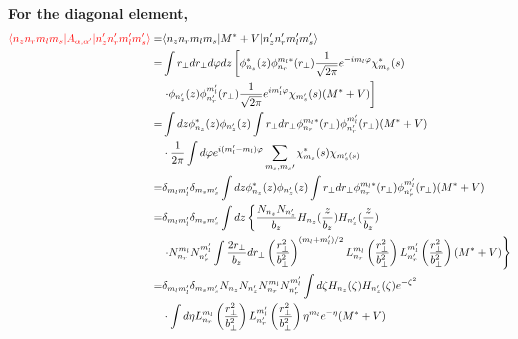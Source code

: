 \textbf{For the diagonal element,}
\begin{equation}
\begin{aligned}
  \textcolor{red}{\langle n_z n_r m_l m_s | A_{\alpha, \alpha^{\prime}} | n_z^{\prime} n_r^{\prime} m_l^{\prime} m_s^{\prime} \rangle} =& \langle n_z n_r m_l m_s | M^* + V | n_z^{\prime} n_r^{\prime} m_l^{\prime} m_s^{\prime} \rangle \\
  =& \int r_{\perp}dr_{\perp}d\varphi dz \left[ \phi_{n_z}^{\ast}(z) \phi_{n_r}^{m_l\ast}(r_{\perp}) \frac{1}{\sqrt{2\pi}}e^{-im_l\varphi} \chi_{m_s}^{\ast}(s) \right.\\
  & \left. \cdot \phi_{n_z^{\prime}}(z) \phi_{n_r^{\prime}}^{m_l^{\prime}}(r_{\perp}) \frac{1}{\sqrt{2\pi}}e^{im_l^{\prime}\varphi} \chi_{m_s^{\prime}}(s) (M^{\ast} + V) \right]  \\
  =& \int dz \phi_{n_z}^{\ast}(z)\phi_{n_z^{\prime}}(z) \int r_{\perp}dr_{\perp}\phi_{n_r}^{m_l\ast}(r_{\perp})\phi_{n_r^{\prime}}^{m_l^{\prime}}(r_{\perp})(M^{\ast}+V)  \\
  & \cdot \frac{1}{2\pi} \int d\varphi e^{i(m_l^{\prime} - m_l)\varphi} \sum_{m_s, m_{s}{\prime}} \chi_{m_s}^{\ast}(s)\chi_{m_s^{\prime}(s)}  \\
  =& \delta_{m_l m_l^{\prime}} \delta_{m_s m_s^{\prime}}\int dz \phi_{n_z}^{\ast}(z)\phi_{n_z^{\prime}}(z) \int r_{\perp}dr_{\perp}\phi_{n_r}^{m_l\ast}(r_{\perp})\phi_{n_r^{\prime}}^{m_l^{\prime}}(r_{\perp})(M^{\ast}+V) \\
  =& \delta_{m_l m_l^{\prime}} \delta_{m_s m_s^{\prime}} \int dz \left\{ \frac{N_{n_z} N_{n_z^{\prime}}}{b_z} H_{n_z}(\frac{z}{b_z})H_{n_z^{\prime}}(\frac{z}{b_z})\right. \\
  & \left. \cdot N_{n_r}^{m_l} N_{n_r^{\prime}}^{m_l^{\prime}} \int \frac{2r_{\perp}}{b_z}dr_{\perp} \left(\frac{r_{\perp}^2}{b_{\perp}^2}\right)^{(m_l + m_l^{\prime})/2} L_{n_r}^{m_l}\left(\frac{r_{\perp}^2}{b_{\perp}^2}\right) L_{n_r^{\prime}}^{m_l^{\prime}}\left(\frac{r_{\perp}^2}{b_{\perp}^2}\right) (M^{\ast} + V) \right\}  \\
  =& \delta_{m_l m_l^{\prime}} \delta_{m_s m_s^{\prime}} N_{n_z} N_{n_z^{\prime}} N_{n_r}^{m_l} N_{n_r^{\prime}}^{m_l^{\prime}} \int d\zeta H_{n_z}(\zeta) H_{n_z^{\prime}}(\zeta) e^{-\zeta^2} \\
  & \cdot \int d\eta L_{n_r}^{m_l}\left(\frac{r_{\perp}^2}{b_{\perp}^2}\right) L_{n_r^{\prime}}^{m_l^{\prime}}\left(\frac{r_{\perp}^2}{b_{\perp}^2}\right) \eta^{m_l}e^{-\eta} (M^{\ast} + V)
\end{aligned}
\end{equation}
